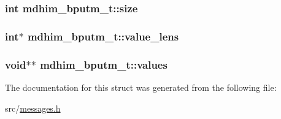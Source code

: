\hypertarget{structmdhim__bputm__t_a480571293980863083cce4de0287a9c3}{
\subsubsection[{size}]{\setlength{\rightskip}{0pt plus 5cm}int mdhim\-\_\-bputm\-\_\-t\-::size}}\label{structmdhim__bputm__t_a480571293980863083cce4de0287a9c3}
\hypertarget{structmdhim__bputm__t_a915478fbead386af153b4b3989ff7fb6}{
\subsubsection[{value\-\_\-lens}]{\setlength{\rightskip}{0pt plus 5cm}int$\ast$ mdhim\-\_\-bputm\-\_\-t\-::value\-\_\-lens}}\label{structmdhim__bputm__t_a915478fbead386af153b4b3989ff7fb6}
\hypertarget{structmdhim__bputm__t_a1b908d082b136370db7574dc25d44853}{
\subsubsection[{values}]{\setlength{\rightskip}{0pt plus 5cm}void$\ast$$\ast$ mdhim\-\_\-bputm\-\_\-t\-::values}}\label{structmdhim__bputm__t_a1b908d082b136370db7574dc25d44853}


The documentation for this struct was generated from the following file\-:\begin{DoxyCompactItemize}
\item 
src/\hyperlink{messages_8h}{messages.\-h}\end{DoxyCompactItemize}
